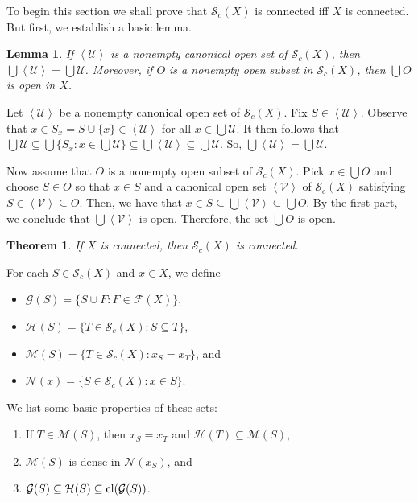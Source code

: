 \documentclass[11pt]{amsart}
\numberwithin{equation}{section}
\theoremstyle{plain}
\newtheorem{theorem}[equation]{Theorem}
\newtheorem{lemma}[equation]{Lemma}
\theoremstyle{definition}
\theoremstyle{definition}
\theoremstyle{definition}
\theoremstyle{definition}
\theoremstyle{definition}
\begin{document}
To begin this section we shall prove that  $\mathcal{S}_c(X)$ is connected iff $X$ is connected. But first, we establish a basic lemma.

\begin{lemma}\label{LUA}
If $\left\langle \mathcal{U}\right\rangle$ is a nonempty canonical open set of $\mathcal{S}_c(X)$, then $\bigcup \left\langle \mathcal{U}\right\rangle = \bigcup \mathcal{U}$. Moreover, if $O$ is a nonempty open subset in $\mathcal{S}_c(X)$, then $\bigcup O$ is open in $X$.
\end{lemma}

\proof
Let $\left\langle \mathcal{U}\right\rangle$ be a nonempty canonical open set of $\mathcal{S}_c(X)$. Fix $S \in \left\langle \mathcal{U}\right\rangle$. Observe that  $x \in S_x = S \cup \{x\} \in \left\langle \mathcal{U}\right\rangle$ for all $x \in \bigcup\mathcal{U}$. It then follows that $\bigcup \mathcal{U} \subseteq \bigcup\{S_x : x \in \bigcup\mathcal{U}\} \subseteq \bigcup \left\langle \mathcal{U}\right\rangle \subseteq \bigcup \mathcal{U}$. So, $\bigcup \left\langle \mathcal{U}\right\rangle = \bigcup \mathcal{U}$.

Now assume that $O$ is a nonempty open subset of $\mathcal{S}_c(X)$. Pick $x \in \bigcup O$ and choose $S \in O$ so that $x \in S$ and a canonical open set $\left\langle \mathcal{V}\right\rangle$ of $\mathcal{S}_c(X)$ satisfying $S \in \left\langle \mathcal{V}\right\rangle \subseteq O$. Then, we have that  $x \in S \subseteq \bigcup\left\langle \mathcal{V}\right\rangle \subseteq \bigcup O$. By the first part, we conclude that $\bigcup\left\langle \mathcal{V}\right\rangle$ is open. Therefore, the set $\bigcup O$ is open.
\endproof

\begin{theorem}\label{SCC}
If $X$ is connected, then $\mathcal{S}_c(X)$ is connected.
\end{theorem}

\proof
For each $S \in \mathcal{S}_c(X)$ and $x \in X$, we define
\begin{itemize}
\item $\mathcal{G}(S) = \{S \cup F : F \in \mathcal{F}(X)\}$,

\item $\mathcal{H}(S) = \{T \in \mathcal{S}_c(X) : S \subseteq T \}$,

\item $\mathcal{M}(S) = \{T \in \mathcal{S}_c(X) : x_S = x_T\}$, and

\item $\mathcal{N}(x) = \{S \in \mathcal{S}_c(X) : x \in S\}$.\medskip
\end{itemize}
We list some basic properties of these sets:
\begin{enumerate}
\item If  $T \in \mathcal{M}(S)$, then $x_S = x_T$  and $\mathcal{H}(T) \subseteq  \mathcal{M}(S)$,

\item $\mathcal{M}(S)$ is dense in $\mathcal{N}(x_S)$,  and

\item  $\mathcal{G}(S) \subseteq \mathcal{H}(S) \subseteq \textnormal{cl}(\mathcal{G}(S))$.
 \end{enumerate}
\end{document}
